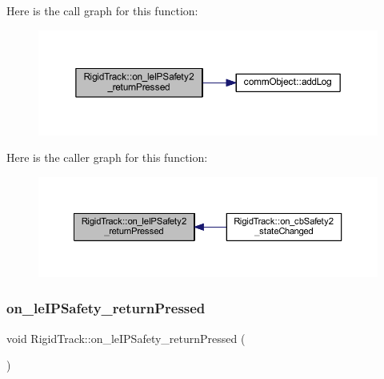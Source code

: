 Here is the call graph for this function\+:\nopagebreak
\begin{figure}[H]
\begin{center}
\leavevmode
\includegraphics[width=350pt]{class_rigid_track_a555c536593d659b940de43cd2db8d6c1_cgraph}
\end{center}
\end{figure}
Here is the caller graph for this function\+:\nopagebreak
\begin{figure}[H]
\begin{center}
\leavevmode
\includegraphics[width=350pt]{class_rigid_track_a555c536593d659b940de43cd2db8d6c1_icgraph}
\end{center}
\end{figure}
\mbox{\label{class_rigid_track_aa527ab3a2ddc7b31bf1063260efc9755}} 
\subsubsection{\texorpdfstring{on\+\_\+le\+I\+P\+Safety\+\_\+return\+Pressed}{on\_leIPSafety\_returnPressed}}
{\footnotesize\ttfamily void Rigid\+Track\+::on\+\_\+le\+I\+P\+Safety\+\_\+return\+Pressed (\begin{DoxyParamCaption}{ }\end{DoxyParamCaption})\hspace{0.3cm}{\ttfamily [slot]}}

